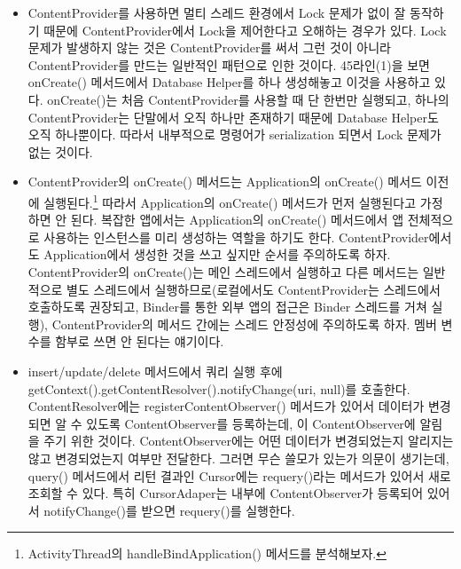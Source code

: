 \begin{itemize}
\item ContentProvider를 사용하면 멀티 스레드 환경에서 Lock 문제가 없이 잘 동작하기 때문에 ContentProvider에서 Lock을 제어한다고 오해하는 경우가 있다. 
Lock 문제가 발생하지 않는 것은 ContentProvider를 써서 그런 것이 아니라 ContentProvider를 만드는 일반적인 패턴으로 인한 것이다.
45라인(1)을 보면 onCreate() 메서드에서 Database Helper를 하나 생성해놓고 이것을 사용하고 있다.
onCreate()는 처음 ContentProvider를 사용할 때 단 한번만 실행되고, 하나의 ContentProvider는 단말에서 오직 하나만 존재하기 때문에 Database Helper도 오직 하나뿐이다. 따라서 내부적으로 명령어가 serialization 되면서 Lock 문제가 없는 것이다.

\item ContentProvider의 onCreate() 메서드는 Application의 onCreate() 메서드 이전에 실행된다.\footnote{ActivityThread의 handleBindApplication() 메서드를 분석해보자.}
따라서 Application의 onCreate() 메서드가 먼저 실행된다고 가정하면 안 된다.
복잡한 앱에서는 Application의 onCreate() 메서드에서 앱 전체적으로 사용하는 인스턴스를 미리 생성하는 역할을 하기도 한다. ContentProvider에서도 Application에서 생성한 것을 쓰고 싶지만 순서를 주의하도록 하자.
ContentProvider의 onCreate()는 메인 스레드에서 실행하고 다른 메서드는 일반적으로 별도 스레드에서 실행하므로(로컬에서도 ContentProvider는 스레드에서 호출하도록 권장되고, Binder를 통한 외부 앱의 접근은 Binder 스레드를 거쳐 실행), ContentProvider의 메서드 간에는 스레드 안정성에 주의하도록 하자. 멤버 변수를 함부로 쓰면 안 된다는 얘기이다.

\item insert/update/delete 메서드에서 쿼리 실행 후에 getContext().getContentResolver().notifyChange(uri, null)를 호출한다. ContentResolver에는 registerContentObserver() 메서드가 있어서 데이터가 변경되면 알 수 있도록 ContentObserver를 등록하는데, 이 ContentObserver에 알림을 주기 위한 것이다. 
ContentObserver에는 어떤 데이터가 변경되었는지 알리지는 않고 변경되었는지 여부만 전달한다. 
그러면 무슨 쓸모가 있는가 의문이 생기는데,
query() 메서드에서 리턴 결과인 Cursor에는 requery()라는 메서드가 있어서 새로 조회할 수 있다. 특히 CursorAdaper는 내부에 ContentObserver가 등록되어 있어서 notifyChange()를 받으면 requery()를 실행한다.

\end{itemize}

